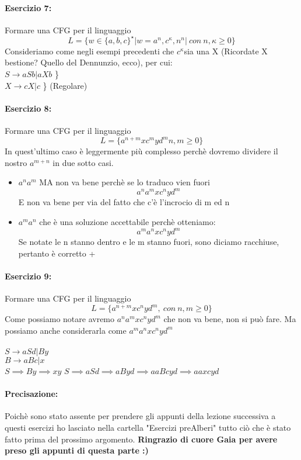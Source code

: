 \documentclass[12pt, a4paper, openany, oneside]{book}
\begin{document}
\paragraph{Esercizio 7: }Formare una CFG per il linguaggio \\
$$L = \{ w\in \{a,b,c\}^{\star} | w = a^{n}, c^{\kappa}, n^{n}
| ~ con ~ n, \kappa \geq 0 \}$$
Consideriamo come negli esempi precedenti che $c^{\kappa} $sia una X (Ricordate 
X bestione? Quello del Dennunzio, ecco), per cui: \\
$S \to aSb | aXb$ \} \\
$X \to cX | c$ \} (Regolare)\\
\paragraph{Esercizio 8: }Formare una CFG per il linguaggio \\
\[L = \{ a^{n+m} x c^{m} y d^{m} n, m \geq 0 \}\]
In quest'ultimo caso è leggermente più complesso perchè dovremo dividere 
il nostro $a^{m+n}$ in due sotto casi.
\begin{itemize}
	\item $a^{n}a^{m}$ MA non va bene perchè se lo traduco vien fuori 
	\[a^{n}a^{m} x c^{n}yd^{m}\]
	E non va bene per via del fatto che c'è l'incrocio di m ed n
	\item $a^{m}a^{n}$ che è una soluzione accettabile perchè otteniamo:
	\[a^{m}a^{n} x c^{n}y d^{m}\] Se notate le n stanno dentro e le m stanno 
	fuori, sono diciamo racchiuse, pertanto è corretto +
\end{itemize}
\paragraph{Esercizio 9: }Formare una CFG per il linguaggio \\
$$L = \{ a^{n+m}xc^{n}yd^{m}, ~con~n,m \geq 0 \}$$
Come possiamo notare avremo $a^{n}a^{m}xc^{n}yd^{m}$ che non va bene, non si 
può fare. Ma possiamo anche considerarla come $a^{m}a^{n}xc^{n}yd^{m}$ \\ \\
$S \to aSd | By$ \\
$B \to aBc | x$ \\
$S \implies By \implies xy$
$S \implies aSd \implies aByd \implies aaBcyd \implies aaxcyd$
\paragraph{Precisazione: } Poichè sono stato assente per prendere gli appunti
della lezione successiva a questi esercizi ho lasciato nella cartella "Esercizi
preAlberi" tutto ciò che è stato fatto prima del prossimo argomento. \textbf{
Ringrazio di cuore Gaia per avere preso gli appunti di questa parte :)}
\end{document}
